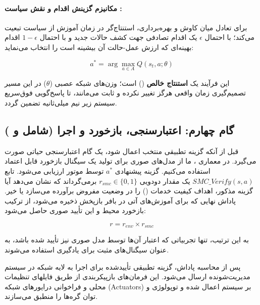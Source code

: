 \documentclass[oneside,openany,phd]{TMU-Thesis}
\begin{document}
\paragraph{مکانیزم گزینش اقدام و نقش سیاست :}

برای تعادل میان کاوش و بهره‌برداری، استنتاج‌گر در زمان آموزش از سیاست  \cite{sutton2018reinforcement, mnih2015human} تبعیت می‌کند؛ با احتمال $\epsilon$ یک اقدام تصادفی جهت کشف حالات جدید و با احتمال $1-\epsilon$ اقدام بهینه‌ای که ارزش عمل-حالت آن بیشینه است را انتخاب می‌نماید:

$$a^* = \arg\max_{a \in A} Q(s_t, a; \theta)$$

این فرآیند یک \textbf{استنتاج خالص} () است؛ وزن‌های شبکه عصبی ($\theta$) در این مسیر تصمیم‌گیری زمان واقعی هرگز تغییر نکرده و ثابت می‌مانند، تا پاسخ‌گویی فوق‌سریع سیستم زیر نیم میلی‌ثانیه تضمین گردد.



\subsection{گام چهارم: اعتبارسنجی، بازخورد و اجرا (شامل  و )}

\label{subsec:verification-execution}



قبل از آنکه گزینه تطبیقی منتخب اعمال شود، یک گام اعتبارسنجی حیاتی صورت می‌گیرد. در معماری ، ما از مدل‌های صوری برای تولید یک سیگنال بازخورد قابل اعتماد استفاده می‌کنیم. گزینه پیشنهادی $a^*$ توسط موتور  \cite{david2015uppaal} ارزیابی می‌شود. تابع $SMC\_Verify(s, a)$ یک مقدار دودویی $r_{smc} \in \{0, 1\}$ برمی‌گرداند که نشان می‌دهد آیا گزینه مذکور، اهداف کیفیت خدمات () را در وضعیت مفروض برآورده می‌سازد یا خیر. پاداش نهایی که برای آموزش‌های آتی در بافر بازپخش ذخیره می‌شود، از ترکیب بازخورد محیط و این تأیید صوری حاصل می‌شود:

\begin{equation}
r = r_{env} \times r_{smc}
\label{eq:combined_reward_new}
\end{equation}

به این ترتیب، تنها تجربیاتی که اعتبار آن‌ها توسط مدل صوری نیز تأیید شده باشد، به عنوان سیگنال‌های مثبت برای یادگیری استفاده می‌شوند.



پس از محاسبه پاداش، گزینه تطبیقی تأییدشده برای اجرا به لایه شبکه در سیستم مدیریت‌شونده ارسال می‌شود. این فرمان‌های بازپیکربندی از طریق فایلهای تنظیمات محلی و فراخوانی درایورهای شبکه (Actuators) بر سیستم اعمال شده و توپولوژی و توان گره‌ها را منطبق می‌سازند.
\end{document}
